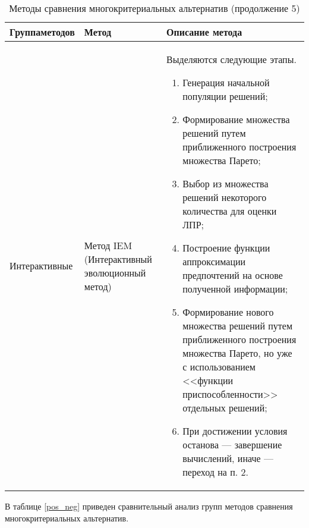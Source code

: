 \begin{table}[H]
	\centering
	\caption{Методы сравнения многокритериальных альтернатив (продолжение 5)}
	\label{mko_table_5}
	\begin{tabular}{|p{3.3cm}|p{2.4cm}|p{9.5cm}|}
		\hline
		\textbf{Группа\linebreak методов} & \textbf{Метод} & \textbf{Описание метода} \\
		\hline
		\multirow{1}{3.3cm}{Интерактивные} & Метод IEM (Интерактивный эволюционный метод) & Выделяются следующие этапы.
		\begin{enumerate}
			\item Генерация начальной популяции решений;
			\item Формирование множества решений путем приближенного построения множества Парето;
			\item Выбор из множества решений некоторого количества для оценки ЛПР;
			\item Построение функции аппроксимации предпочтений на основе полученной информации;
			\item Формирование нового множества решений путем приближенного построения множества Парето, но уже с использованием <<функции приспособленности>> отдельных решений;
			\item При достижении условия останова --- завершение вычислений, иначе --- переход на п. 2.
		\end{enumerate}\\
		\hline
	\end{tabular}
\end{table}

В таблице \ref{pos_neg} приведен сравнительный анализ групп методов сравнения многокритериальных альтернатив.

